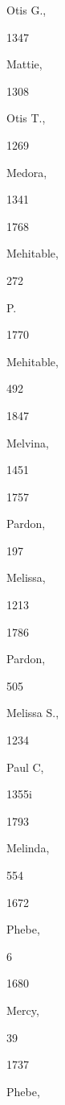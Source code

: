 {{Otis G., 


1347 




Mattie, 


1308 




Otis T., 


1269 




Medora, 


1341 








1768 


Mehitable, 


272 




P. 




1770 


Mehitable, 


492 








1847 


Melvina, 


1451 


1757 


Pardon, 


197 




Melissa, 


1213 


1786 


Pardon, 


505 




Melissa S., 


1234 




Paul C, 


1355i 


1793 


Melinda, 


554 


1672 


Phebe, 


6 


1680 


Mercy, 


39 


1737 


Phebe, 


}}
